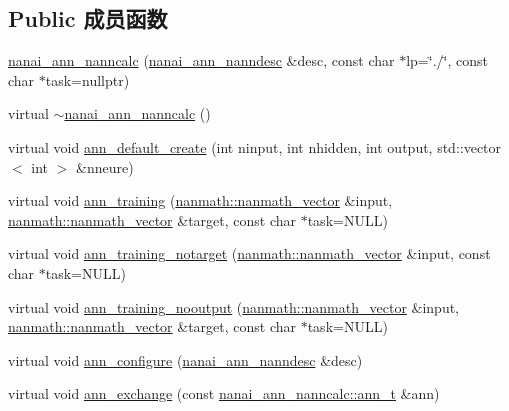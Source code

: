 \subsection*{Public 成员函数}
\begin{DoxyCompactItemize}
\item 
\hyperlink{classnanai_1_1nanai__ann__nanncalc_ac920b08afc8fe7a698fa1e105dd7b5cb}{nanai\+\_\+ann\+\_\+nanncalc} (\hyperlink{namespacenanai_a892a8c80381d0005a076b68fbbf2d918}{nanai\+\_\+ann\+\_\+nanndesc} \&desc, const char $\ast$lp=\char`\"{}./\char`\"{}, const char $\ast$task=nullptr)
\item 
virtual \hyperlink{classnanai_1_1nanai__ann__nanncalc_a2f5530f782f2585958c79c94bc3232d7}{$\sim$nanai\+\_\+ann\+\_\+nanncalc} ()
\item 
virtual void \hyperlink{classnanai_1_1nanai__ann__nanncalc_a9a2bdcebe0c659e6f6e3466674cc9143}{ann\+\_\+default\+\_\+create} (int ninput, int nhidden, int output, std\+::vector$<$ int $>$ \&nneure)
\item 
virtual void \hyperlink{classnanai_1_1nanai__ann__nanncalc_a0f2a230581dd2c530f35d22d1cd11982}{ann\+\_\+training} (\hyperlink{classnanmath_1_1nanmath__vector}{nanmath\+::nanmath\+\_\+vector} \&input, \hyperlink{classnanmath_1_1nanmath__vector}{nanmath\+::nanmath\+\_\+vector} \&target, const char $\ast$task=N\+U\+L\+L)
\item 
virtual void \hyperlink{classnanai_1_1nanai__ann__nanncalc_a95e5d9672cf1a74e4180389fbf41b899}{ann\+\_\+training\+\_\+notarget} (\hyperlink{classnanmath_1_1nanmath__vector}{nanmath\+::nanmath\+\_\+vector} \&input, const char $\ast$task=N\+U\+L\+L)
\item 
virtual void \hyperlink{classnanai_1_1nanai__ann__nanncalc_a2b1396b5691391e33859c17ab748a39d}{ann\+\_\+training\+\_\+nooutput} (\hyperlink{classnanmath_1_1nanmath__vector}{nanmath\+::nanmath\+\_\+vector} \&input, \hyperlink{classnanmath_1_1nanmath__vector}{nanmath\+::nanmath\+\_\+vector} \&target, const char $\ast$task=N\+U\+L\+L)
\item 
virtual void \hyperlink{classnanai_1_1nanai__ann__nanncalc_a8563aaf57e70ab959dcdec8961af9447}{ann\+\_\+configure} (\hyperlink{namespacenanai_a892a8c80381d0005a076b68fbbf2d918}{nanai\+\_\+ann\+\_\+nanndesc} \&desc)
\item 
virtual void \hyperlink{classnanai_1_1nanai__ann__nanncalc_a6ec3d7893411dcab2edf4e19ae3bb017}{ann\+\_\+exchange} (const \hyperlink{classnanai_1_1nanai__ann__nanncalc_1_1ann__t}{nanai\+\_\+ann\+\_\+nanncalc\+::ann\+\_\+t} \&ann)
\item 

\end{DoxyCompactItemize}
